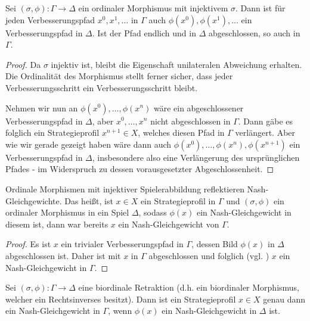 \begin{prop}
	Sei $(\sigma, \phi): \Gamma \to \Delta$ ein ordinaler Morphismus mit injektivem $\sigma$. Dann ist für jeden Verbesserungspfad $x^0, x^1, \dots$ in $\Gamma$ auch $\phi(x^0), \phi(x^1), \dots$ ein Verbesserungspfad in $\Delta$. Ist der Pfad endlich und in $\Delta$ abgeschlossen, so auch in $\Gamma$.
\end{prop}

\begin{proof}
	Da $\sigma$ injektiv ist, bleibt die Eigenschaft unilateralen Abweichung erhalten. Die Ordinalität des Morphismus stellt ferner sicher, dass jeder Verbesserungsschritt ein Verbesserungsschritt bleibt.
	
	Nehmen wir nun an $\phi(x^0), \dots, \phi(x^n)$ wäre ein abgeschlossener Verbesserungspfad in $\Delta$, aber $x^0, \dots, x^n$ nicht abgeschlossen in $\Gamma$. Dann gäbe es folglich ein Strategieprofil $x^{n+1} \in X$, welches diesen Pfad in $\Gamma$ verlängert. Aber wie wir gerade gezeigt haben wäre dann auch $\phi(x^0), \dots, \phi(x^n), \phi(x^{n+1})$ ein Verbesserungspfad in $\Delta$, insbesondere also eine Verlängerung des ursprünglichen Pfades - im Widerspruch zu dessen vorausgesetzter Abgeschlossenheit.
\end{proof}

\begin{kor}\label{kor:ReflektNG}
	Ordinale Morphismen mit injektiver Spielerabbildung reflektieren Nash-Gleichgewichte. Das heißt, ist $x \in X$ ein Strategieprofil in $\Gamma$ und $(\sigma, \phi)$ ein ordinaler Morphismus in ein Spiel $\Delta$, sodass $\phi(x)$ ein Nash-Gleichgewicht in diesem ist, dann war bereits $x$ ein Nash-Gleichgewicht von $\Gamma$.
\end{kor}

\begin{proof}
	Es ist $x$ ein trivialer Verbesserungspfad in $\Gamma$, dessen Bild $\phi(x)$ in $\Delta$ abgeschlossen ist. Daher ist mit   $x$ in $\Gamma$ abgeschlossen und folglich (vgl. ) $x$ ein Nash-Gleichgewicht in $\Gamma$.
\end{proof}

\begin{prop}\label{prop:NGerhalten}
	Sei $(\sigma, \phi): \Gamma \to \Delta$ eine biordinale Retraktion (d.h. ein biordinaler Morphismus, welcher ein Rechtsinverses besitzt). Dann ist ein Strategieprofil $x \in X$ genau dann ein Nash-Gleichgewicht in $\Gamma$, wenn $\phi(x)$ ein Nash-Gleichgewicht in $\Delta$ ist.
\end{prop}

